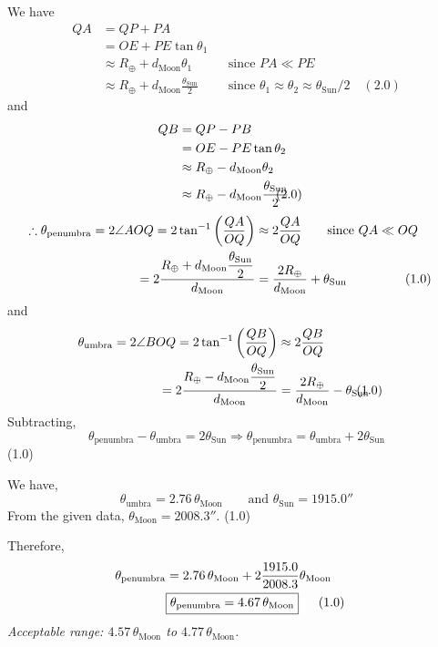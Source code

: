 \begin{description}
We have
\begin{align*}
QA &= QP + PA\\
 &= OE + PE\tan\theta_1\\
 &\approx R_\oplus + d_{\mathrm{Moon}}\theta_1 & &\text{since } PA \ll PE\\
 &\approx R_\oplus + d_{\mathrm{Moon}}\frac{\theta_{\mathrm{Sun}}}{2}
   & &\text{since } \theta_1 \approx \theta_2 \approx \theta_{\mathrm{Sun}}/2
   \quad(2.0)
\end{align*}
and
\begin{align*}
QB &= QP - PB\\
 &= OE - PE\tan\theta_2\\
 &\approx R_\oplus - d_{\mathrm{Moon}}\theta_2\\
 &\approx R_\oplus - d_{\mathrm{Moon}}\frac{\theta_{\mathrm{Sun}}}{2}
   & &\hspace{-2em}(2.0)
\end{align*}
\begin{align*}
\therefore \theta_{\mathrm{penumbra}} = 2\angle AOQ
 = 2\tan^{-1}\left(\frac{QA}{OQ}\right) &\approx 2\frac{QA}{OQ}
   \qquad\text{since } QA \ll OQ\\
 = 2\frac{R_\oplus + d_{\mathrm{Moon}}\dfrac{\theta_{\mathrm{Sun}}}{2}}{d_{\mathrm{Moon}}}
 &= \frac{2R_\oplus}{d_{\mathrm{Moon}}} + \theta_{\mathrm{Sun}}
   & &\hspace{-2em}(1.0)
\end{align*}
and
\begin{align*}
\theta_{\mathrm{umbra}} = 2\angle BOQ
 = 2\tan^{-1}\left(\frac{QB}{OQ}\right) &\approx 2\frac{QB}{OQ}\\
 = 2\frac{R_\oplus - d_{\mathrm{Moon}}\dfrac{\theta_{\mathrm{Sun}}}{2}}{d_{\mathrm{Moon}}}
 &= \frac{2R_\oplus}{d_{\mathrm{Moon}}} - \theta_{\mathrm{Sun}}
   & &\hspace{-2em}(1.0)
\end{align*}
Subtracting,
\[
\theta_{\mathrm{penumbra}} - \theta_{\mathrm{umbra}} = 2\theta_{\mathrm{Sun}}
\Rightarrow \theta_{\mathrm{penumbra}} = \theta_{\mathrm{umbra}} + 2\theta_{\mathrm{Sun}}
\]
\hfill(1.0)

We have,
\[
\theta_{\mathrm{umbra}} = 2.76\,\theta_{\mathrm{Moon}}
\qquad\text{and } \theta_{\mathrm{Sun}} = 1915.0''
\]
From the given data, $\theta_{\mathrm{Moon}} = 2008.3''$. \hfill(1.0)

Therefore,
\begin{align*}
\theta_{\mathrm{penumbra}} &= 2.76\,\theta_{\mathrm{Moon}}
 + 2\frac{1915.0}{2008.3}\theta_{\mathrm{Moon}}\\
&\fbox{$\theta_{\mathrm{penumbra}} = 4.67\,\theta_{\mathrm{Moon}}$}
 & &\hspace{-2em}(1.0)
\end{align*}
\emph{Acceptable range: $4.57\,\theta_{\mathrm{Moon}}$ to $4.77\,\theta_{\mathrm{Moon}}$.}


\end{description}
